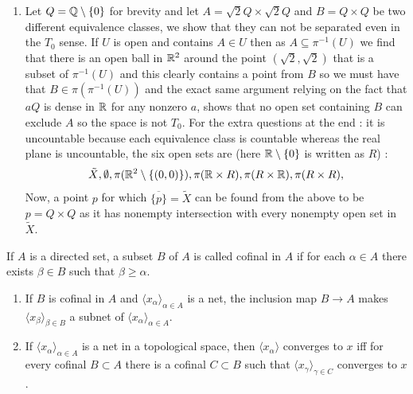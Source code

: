 \documentclass[12pt,a4paper]{article}
\begin{document}
\begin{solution}
\begin{enumerate}[label=\alph*.]
\item Let $Q=\mathbb{Q}\setminus\{0\}$ for brevity and let $A= \sqrt{2}Q\times\sqrt{2}Q$ and $B=Q\times Q$ be two different equivalence classes, we show that they can not be separated even in the $T_0$ sense. 
    If $U$ is open and contains $A\in U$ then as $A\subseteq\pi^{-1}(U)$ we find that there is an open ball in $\mathbb{R}^2$ around the point $(\sqrt{2},\sqrt{2})$ that is a subset of $\pi^{-1}(U)$ and this clearly contains a point from $B$ so we must have that $B\in\pi(\pi^{-1}(U))$ and the exact same argument relying on the fact that $aQ$ is dense in $\mathbb{R}$ for any nonzero $a$, shows that no open set containing $B$ can exclude $A$ so the space is not $T_0.$ 
    For the extra questions at the end : it is uncountable because each equivalence class is countable whereas the real plane is uncountable, the six open sets are (here $\mathbb{R}\setminus\{0\}$ is written as $R$) :
    \[
        \tilde{X},\emptyset,\pi(\mathbb{R}^2\setminus\{(0,0)\}),\pi(\mathbb{R}\times R),\pi(R\times\mathbb{R}),\pi(R\times R),
    \]
    Now, a point $p$ for which $\overline{\{p\}}=\tilde{X}$ can be found from the above to be $p=Q\times Q$ as it has nonempty intersection with every nonempty open set in $\tilde{X}.$  
\end{enumerate} 
\end{solution}
\begin{problem}\label{prob:4-30}
If $A$ is a directed set, a subset $B$ of $A$ is called cofinal in $A$ if for each $\alpha \in A$ there exists $\beta \in B$ such that $\beta \ge \alpha$.
\begin{enumerate}[label=\alph*.]
    \item If $B$ is cofinal in $A$ and $\langle x_\alpha \rangle_{\alpha \in A}$ is a net, the inclusion map $B \to A$ makes $\langle x_\beta \rangle_{\beta \in B}$ a subnet of $\langle x_\alpha \rangle_{\alpha \in A}$.
    \item If $\langle x_\alpha \rangle_{\alpha \in A}$ is a net in a topological space, then $\langle x_\alpha \rangle$ converges to $x$ iff for every cofinal $B \subset A$ there is a cofinal $C \subset B$ such that $\langle x_\gamma \rangle_{\gamma \in C}$ converges to $x$.
\end{enumerate}
\end{problem}
\end{document}
